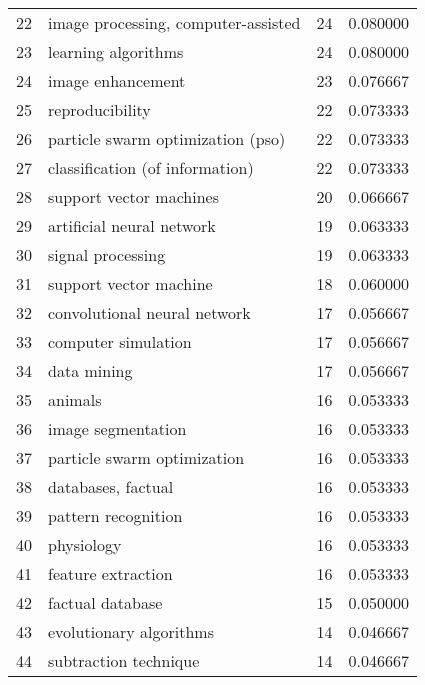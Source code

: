 \begin{tabular}{llrr}
22 &      image processing, computer-assisted &          24 &    0.080000 \\
23 &                      learning algorithms &          24 &    0.080000 \\
24 &                        image enhancement &          23 &    0.076667 \\
25 &                          reproducibility &          22 &    0.073333 \\
26 &        particle swarm optimization (pso) &          22 &    0.073333 \\
27 &          classification (of information) &          22 &    0.073333 \\
28 &                  support vector machines &          20 &    0.066667 \\
29 &                artificial neural network &          19 &    0.063333 \\
30 &                        signal processing &          19 &    0.063333 \\
31 &                   support vector machine &          18 &    0.060000 \\
32 &             convolutional neural network &          17 &    0.056667 \\
33 &                      computer simulation &          17 &    0.056667 \\
34 &                              data mining &          17 &    0.056667 \\
35 &                                  animals &          16 &    0.053333 \\
36 &                       image segmentation &          16 &    0.053333 \\
37 &              particle swarm optimization &          16 &    0.053333 \\
38 &                       databases, factual &          16 &    0.053333 \\
39 &                      pattern recognition &          16 &    0.053333 \\
40 &                               physiology &          16 &    0.053333 \\
41 &                       feature extraction &          16 &    0.053333 \\
42 &                         factual database &          15 &    0.050000 \\
43 &                  evolutionary algorithms &          14 &    0.046667 \\
44 &                    subtraction technique &          14 &    0.046667 \\

\end{tabular}
